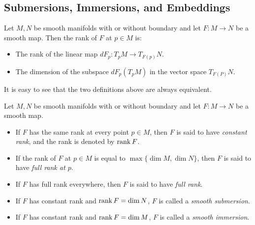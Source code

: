 \subsection{Submersions, Immersions, and Embeddings}

\begin{defn}[Rank]
  Let $M, N$ be smooth manifolds with or without boundary and let $F: M \rightarrow N$ be a smooth map.
  Then the rank of $F$ at $p \in M$ is:
  \begin{itemize}
    \item
      The rank of the linear map $dF_p: T_pM \rightarrow T_{F(p)}N$.
    \item
      The dimension of the subspace $dF_p(T_pM)$ in the vector space $T_{F(P)}N$.
  \end{itemize}
  It is easy to see that the two definitions above are always equivalent.
\end{defn}

\begin{defn}
  Let $M, N$ be smooth manifolds with or without boundary and let $F: M \rightarrow N$ be a smooth map.
  \begin{itemize}
    \item
      If $F$ has the same rank at every point $p \in M$, then $F$ is said to have \textit{constant rank}, and the rank is denoted by $\rank F$.
    \item
      If the rank of $F$ at $p \in M$ is equal to $\max \{ \dim M, \dim N \}$, then $F$ is said to have \textit{full rank at $p$}.
    \item
      If $F$ has full rank everywhere, then $F$ is said to have \textit{full rank}.
    \item
      If $F$ has constant rank and $\rank F = \dim N$, $F$ is called a \textit{smooth submersion}.
    \item
      If $F$ has constant rank and $\rank F = \dim M$, $F$ is called a \textit{smooth immersion}.
  \end{itemize}
\end{defn}
